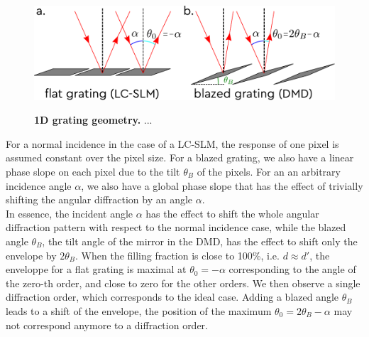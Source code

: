 \documentclass[12pt]{iopart}
\begin{document}
\begin{figure}
  \centering
  \includegraphics[width = \textwidth]{images/grating_geom.pdf}
  \label{fig:flat_grating}

  \caption{
  \textbf{1D grating geometry.}
 ...
  }
  \label{fig:grating_geom}
  \end{figure}


For a normal incidence 
in the case of a LC-SLM, the response of one pixel is 
assumed constant over the pixel size. 
For a blazed grating, we also have a linear phase slope on each pixel due to the tilt $\theta_B$ of the pixels.
For an an arbitrary incidence angle $\alpha$, we also have a global phase slope 
that has the effect of trivially shifting the angular diffraction by an angle $\alpha$.\\

In essence, the incident angle $\alpha$ has the effect to shift the whole angular diffraction pattern 
with respect to the normal incidence case, 
while the blazed angle $\theta_B$, the tilt angle of the mirror in the DMD, 
has the effect to shift only the envelope by $2\theta_B$.
When the filling fraction is close to 100\%, 
i.e. $d\approx d'$,
the enveloppe for a flat grating is maximal 
at $\theta_0=-\alpha$ corresponding to the angle of the zero-th order,
and close to zero for the other orders.
We then observe a single diffraction order, 
which corresponds to the ideal case.
Adding a blazed angle $\theta_B$ leads to a shift of the envelope, 
the position of the maximum 
$\theta_0=2\theta_B-\alpha$ 
may not correspond anymore to a diffraction order.\\
\end{document}
